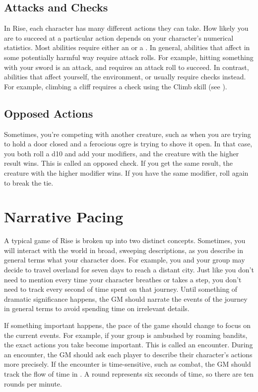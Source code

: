     \subsection{Attacks and Checks}
        In Rise, each character has many different actions they can take.
        How likely you are to succeed at a particular action depends on your character's numerical statistics.
        Most abilities require either an  or a .
        In general, abilities that affect  in some potentially harmful way require attack rolls.
        For example, hitting something with your sword is an attack, and requires an attack roll to succeed.
        In contrast, abilities that affect yourself, the environment, or  usually require checks instead.
        For example, climbing a cliff requires a check using the Climb skill (see ).

    \subsection{Opposed Actions}
        Sometimes, you're competing with another creature, such as when you are trying to hold a door closed and a ferocious ogre is trying to shove it open.
        In that case, you both roll a d10 and add your modifiers, and the creature with the higher result wins.
        This is called an opposed check.
        If you get the same result, the creature with the higher modifier wins.
        If you have the same modifier, roll again to break the tie.

\section{Narrative Pacing}
    A typical game of Rise is broken up into two distinct concepts.
    Sometimes, you will interact with the world in broad, sweeping descriptions, as you describe in general terms what your character does.
    For example, you and your group may decide to travel overland for seven days to reach a distant city.
    Just like you don't need to mention every time your character breathes or takes a step, you don't need to track every second of time spent on that journey.
    Until something of dramatic significance happens, the GM should narrate the events of the journey in general terms to avoid spending time on irrelevant details.

    If something important happens, the pace of the game should change to focus on the current events.
    For example, if your group is ambushed by roaming bandits, the exact actions you take become important.
    This is called an encounter.
    During an encounter, the GM should ask each player to describe their character's actions more precisely.
    If the encounter is time-sensitive, such as combat, the GM should track the flow of time in .
    A round represents six seconds of time, so there are ten rounds per minute.

